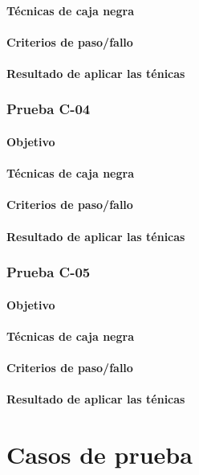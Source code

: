\documentclass[10pt,a4paper]{article}
\begin{document}
			\paragraph{Técnicas de caja negra}
			\paragraph{Criterios de paso/fallo}
			\paragraph{Resultado de aplicar las ténicas}
			\subsubsection{Prueba C-04}
			\paragraph{Objetivo}
			\paragraph{Técnicas de caja negra}
			\paragraph{Criterios de paso/fallo}
			\paragraph{Resultado de aplicar las ténicas}
			\subsubsection{Prueba C-05}
			\paragraph{Objetivo}
			\paragraph{Técnicas de caja negra}
			\paragraph{Criterios de paso/fallo}
			\paragraph{Resultado de aplicar las ténicas}
\section{Casos de prueba}
\end{document}
